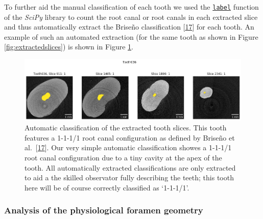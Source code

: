 \documentclass[
  american,
]{article}
\begin{document}
To further aid the manual classification of each tooth we used the \href{https://docs.scipy.org/doc/scipy/reference/generated/scipy.ndimage.label.html}{\texttt{label}} function of the \emph{SciPy} library to count the root canal or root canals in each extracted slice and thus automatically extract the Briseño classification {[}\protect\hyperlink{ref-ZTgDEakx}{17}{]} for each tooth.
An example of such an automated extraction (for the same tooth as shown in Figure \ref{fig:extractedslices}) is shown in Figure \ref{fig:briseno}.

\begin{figure}
\hypertarget{fig:briseno}{%
\centering
\includegraphics{images/Tooth036.Briseno.png}
\caption{Automatic classification of the extracted tooth slices.
This tooth features a 1-1-1/1 root canal configuration as defined by Briseño et al.~{[}\protect\hyperlink{ref-ZTgDEakx}{17}{]}.
Our very simple automatic classification showes a 1-1-1/1 root canal configuration due to a tiny cavity at the apex of the tooth.
All automatically extracted classifications are only extracted to aid a the skilled observator fully describing the teeth; this tooth here will be of course correctly classified as `1-1-1/1'.}\label{fig:briseno}
}
\end{figure}

\hypertarget{analysis-of-the-physiological-foramen-geometry}{%
\subsubsection{Analysis of the physiological foramen geometry}\label{analysis-of-the-physiological-foramen-geometry}}
\end{document}
